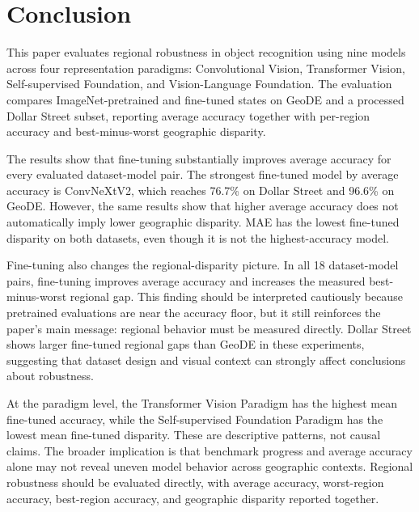 \section{Conclusion}

This paper evaluates regional robustness in object recognition using nine models across four representation paradigms: Convolutional Vision, Transformer Vision, Self-supervised Foundation, and Vision-Language Foundation. The evaluation compares ImageNet-pretrained and fine-tuned states on GeoDE and a processed Dollar Street subset, reporting average accuracy together with per-region accuracy and best-minus-worst geographic disparity.

The results show that fine-tuning substantially improves average accuracy for every evaluated dataset-model pair. The strongest fine-tuned model by average accuracy is ConvNeXtV2, which reaches 76.7\% on Dollar Street and 96.6\% on GeoDE. However, the same results show that higher average accuracy does not automatically imply lower geographic disparity. MAE has the lowest fine-tuned disparity on both datasets, even though it is not the highest-accuracy model.

Fine-tuning also changes the regional-disparity picture. In all 18 dataset-model pairs, fine-tuning improves average accuracy and increases the measured best-minus-worst regional gap. This finding should be interpreted cautiously because pretrained evaluations are near the accuracy floor, but it still reinforces the paper's main message: regional behavior must be measured directly. Dollar Street shows larger fine-tuned regional gaps than GeoDE in these experiments, suggesting that dataset design and visual context can strongly affect conclusions about robustness.

At the paradigm level, the Transformer Vision Paradigm has the highest mean fine-tuned accuracy, while the Self-supervised Foundation Paradigm has the lowest mean fine-tuned disparity. These are descriptive patterns, not causal claims. The broader implication is that benchmark progress and average accuracy alone may not reveal uneven model behavior across geographic contexts. Regional robustness should be evaluated directly, with average accuracy, worst-region accuracy, best-region accuracy, and geographic disparity reported together.
